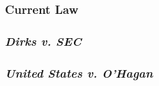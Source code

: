 
\subsubsection{Current Law}


\subsubsection{\emph{Dirks v. SEC}}


\subsubsection{\emph{United States v. O'Hagan}}

